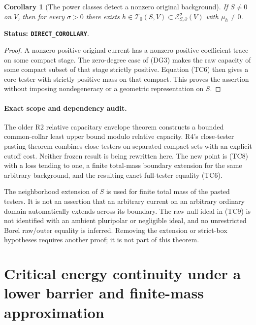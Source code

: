 \documentclass[11pt,a4paper]{article}
\numberwithin{equation}{section}
\newtheorem{corollary}[theorem]{Corollary}
\theoremstyle{definition}
\theoremstyle{remark}
\begin{document}
\begin{corollary}[The power classes detect a nonzero original background]
\label{cor:r11-nonvacuous-power-testers}
If $S\ne0$ on $V$, then for every $\sigma>0$ there exists
$h\in\mathscr T_0(S,V)\subset\mathcal E^\sigma_{S,\partial}(V)$
with $\mu_h\ne0$.
\end{corollary}

\noindent\textbf{Status: \texttt{DIRECT\_COROLLARY}}.

\begin{proof}
A nonzero positive original current has a nonzero positive
coefficient trace on some compact stage. The zero-degree
case of (DG3) makes the raw capacity of some compact subset
of that stage strictly positive. Equation (TC6) then gives
a core tester with strictly positive mass on that compact.
This proves the assertion without imposing nondegeneracy
or a geometric representation on $S$.
\end{proof}

\paragraph{Exact scope and dependency audit.}
The older R2 relative capacitary envelope theorem constructs a
bounded common-collar least upper bound modulo relative capacity.
R4's close-tester pasting theorem combines close testers on separated
compact sets with an explicit cutoff cost. Neither frozen result is
being rewritten here. The new point is (TC8) with a loss tending to
one, a finite total-mass boundary extension for the same arbitrary
background, and the resulting exact full-tester equality (TC6).

The neighborhood extension of $S$ is used for finite total mass of
the pasted testers. It is not an assertion that an arbitrary current
on an arbitrary ordinary domain automatically extends across its
boundary. The raw null ideal in (TC9) is not identified with an
ambient pluripolar or negligible ideal, and no unrestricted Borel
raw/outer equality is inferred. Removing the extension or strict-box
hypotheses requires another proof; it is not part of this theorem.




\section{Critical energy continuity under a lower barrier and finite-mass approximation}
\label{sec:r11-barrier-energy-approximation}
\end{document}
